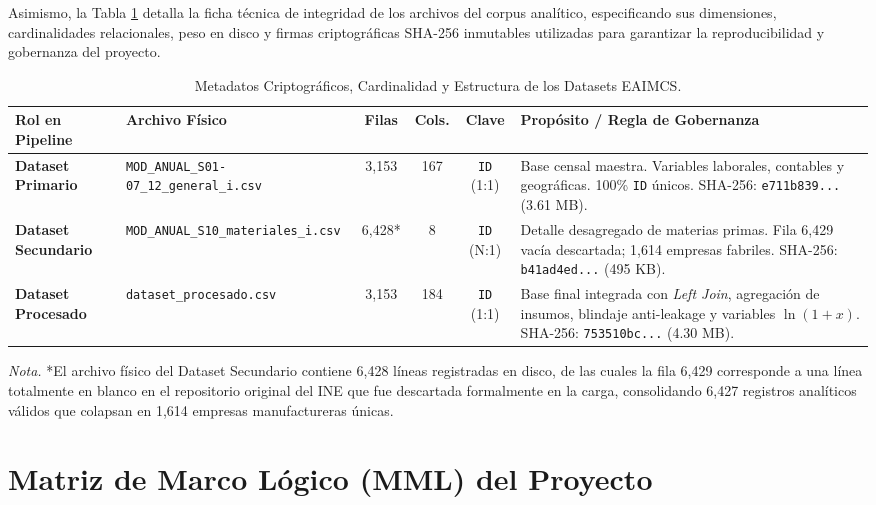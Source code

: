 Asimismo, la Tabla \ref{tab:metadatos_datasets} detalla la ficha técnica de integridad de los archivos del corpus analítico, especificando sus dimensiones, cardinalidades relacionales, peso en disco y firmas criptográficas SHA-256 inmutables utilizadas para garantizar la reproducibilidad y gobernanza del proyecto.

\begin{table}[htbp]
\centering
\caption{Metadatos Criptográficos, Cardinalidad y Estructura de los Datasets EAIMCS.}
\label{tab:metadatos_datasets}
\footnotesize
\begin{tabularx}{\textwidth}{>{\bfseries}lp{3.6cm}cccX}
\toprule
\textbf{Rol en Pipeline} & \textbf{Archivo Físico} & \textbf{Filas} & \textbf{Cols.} & \textbf{Clave} & \textbf{Propósito / Regla de Gobernanza} \\
\midrule
\textbf{Dataset Primario} & {\scriptsize\texttt{MOD\_ANUAL\_S01-07\_}\newline\texttt{12\_general\_i.csv}} & 3,153 & 167 & \texttt{ID} (1:1) & Base censal maestra. Variables laborales, contables y geográficas. 100\% \texttt{ID} únicos. SHA-256: \texttt{e711b839...} (3.61 MB). \\
\addlinespace
\textbf{Dataset Secundario} & {\scriptsize\texttt{MOD\_ANUAL\_S10\_}\newline\texttt{materiales\_i.csv}} & 6,428* & 8 & \texttt{ID} (N:1) & Detalle desagregado de materias primas. Fila 6,429 vacía descartada; 1,614 empresas fabriles. SHA-256: \texttt{b41ad4ed...} (495 KB). \\
\addlinespace
\textbf{Dataset Procesado} & {\scriptsize\texttt{dataset\_procesado.csv}} & 3,153 & 184 & \texttt{ID} (1:1) & Base final integrada con \textit{Left Join}, agregación de insumos, blindaje anti-leakage y variables $\ln(1+x)$. SHA-256: \texttt{753510bc...} (4.30 MB). \\
\bottomrule
\end{tabularx}
\vspace{2mm}
\raggedright\footnotesize
\textit{Nota.} *El archivo físico del Dataset Secundario contiene 6,428 líneas registradas en disco, de las cuales la fila 6,429 corresponde a una línea totalmente en blanco en el repositorio original del INE que fue descartada formalmente en la carga, consolidando 6,427 registros analíticos válidos que colapsan en 1,614 empresas manufactureras únicas.
\end{table}

\section{Matriz de Marco Lógico (MML) del Proyecto}
\label{anexo:marco_logico}


